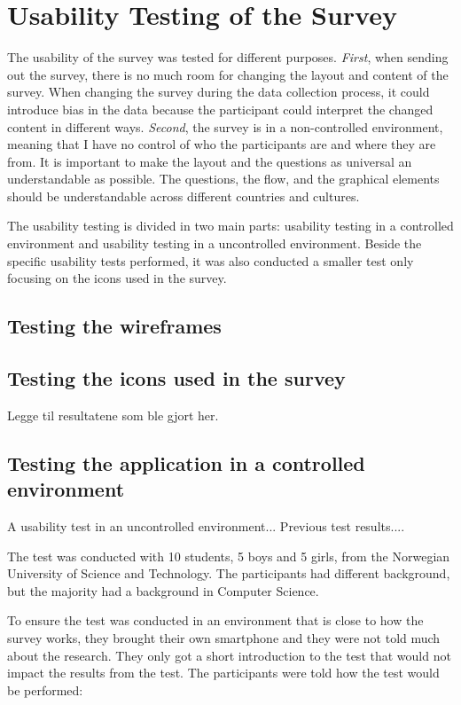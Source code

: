 \section{Usability Testing of the Survey}\label{sec:usabilitytestingsurvey}

  The usability of the survey was tested for different purposes. {\it First}, when sending out the survey, there is no much room for changing the layout and content of the survey. When changing the survey during the data collection process, it could introduce bias in the data because the participant could interpret the changed content in different ways. {\it Second}, the survey is in a non-controlled environment, meaning that I have no control of who the participants are and where they are from. It is important to make the layout and the questions as universal an understandable as possible. The questions, the flow, and the graphical elements should be understandable across different countries and cultures. 

  The usability testing is divided in two main parts: usability testing in a controlled environment and usability testing in a uncontrolled environment. Beside the specific usability tests performed, it was also conducted a smaller test only focusing on the icons used in the survey.

    \subsection{Testing the wireframes}


    \subsection{Testing the icons used in the survey}\label{sec:usabilityicontest}
      Legge til resultatene som ble gjort her.

  	\subsection{Testing the application in a controlled environment}
    A usability test in an uncontrolled environment...
    Previous test results....

    The test was conducted with 10 students, 5 boys and 5 girls, from the Norwegian University of Science and Technology. The participants had different background, but the majority had a background in Computer Science.

    To ensure the test was conducted in an environment that is close to how the survey works, they brought their own smartphone and they were not told much about the research. They only got a short introduction to the test that would not impact the results from the test. The participants were told how the test would be performed:

